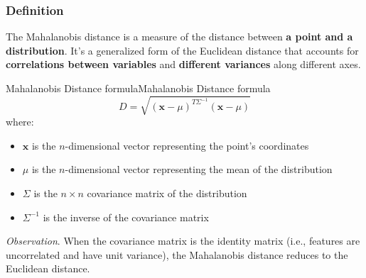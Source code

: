 \documentclass[a4paper]{article}
\theoremstyle{definition}
\begin{document}
\subsubsection{Definition}
The Mahalanobis distance is a measure of the distance between \textbf{a point and a distribution}.
It's a generalized form of the Euclidean distance that accounts for \textbf{correlations between variables} and 
\textbf{different variances} along different axes.
\begin{definition}{Mahalanobis Distance formula}{Mahalanobis Distance formula}
\[
  D = \sqrt{(\mathbf{x} - \mu)^{T\Sigma^{-1}}(\mathbf{x} - \mu)}
\]
where:
\begin{itemize}
    \item \( \mathbf{x} \) is the \( n \)-dimensional vector representing the point's coordinates 
    \item \( \mu \) is the \( n \)-dimensional vector representing the mean of the distribution 
    \item \( \Sigma \) is the \( n \times n \) covariance matrix of the distribution 
    \item \( \Sigma^{-1} \) is the inverse of the covariance matrix 
\end{itemize}
\end{definition}
\textit{Observation}. When the covariance matrix is the identity matrix (i.e., features are uncorrelated and have 
unit variance), the Mahalanobis distance reduces to the Euclidean distance.
\end{document}
